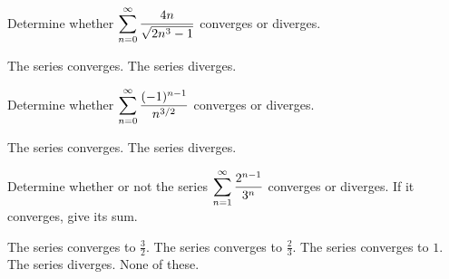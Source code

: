 \documentclass[12pt]{exam}
\newcommand{\ds}{\ensuremath{\displaystyle}}
\begin{document}
\begin{center}
\end{center}
\vspace{0.1in}

\begin{questions}

\setcounter{question}{0}
\question[10]
Determine whether $\ds \sum_{n=0}^{\infty} \frac{4n}{\sqrt{2n^3-1}}$
converges or diverges.

\begin{checkboxes}
\choice The series converges.
\CorrectChoice The series diverges.
\end{checkboxes}

\vfill

\question[10]
Determine whether $\ds \sum_{n=0}^{\infty} \frac{(-1)^{n-1}}{n^{3/2}}$
converges or diverges.

\begin{checkboxes}
\CorrectChoice The series converges.
\choice The series diverges.
\end{checkboxes}

\vfill

\question[5]
Determine whether or not the series $\ds\sum_{n=1}^{\infty} \frac{2^{n-1}}{3^n}$
converges or diverges. If it converges, give its sum.

\begin{checkboxes}
\choice The series converges to $\frac{3}{2}$.
\choice The series converges to $\frac{2}{3}$.
\CorrectChoice The series converges to $1$.
\choice The series diverges.
\choice None of these.
\end{checkboxes}

\vfill

\end{questions}
\end{document}
